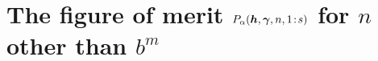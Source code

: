 \documentclass[authoryear]{elsarticle}
\DeclareMathOperator{\appxint}{\hat{I}}
\newcommand{\onetos}{1\!:\!s}
\begin{document}




\section{The figure of merit $P_{\alpha}(\vh,\vgamma,n,\onetos)$ for  $n$ other than $b^m$}







\end{document}
